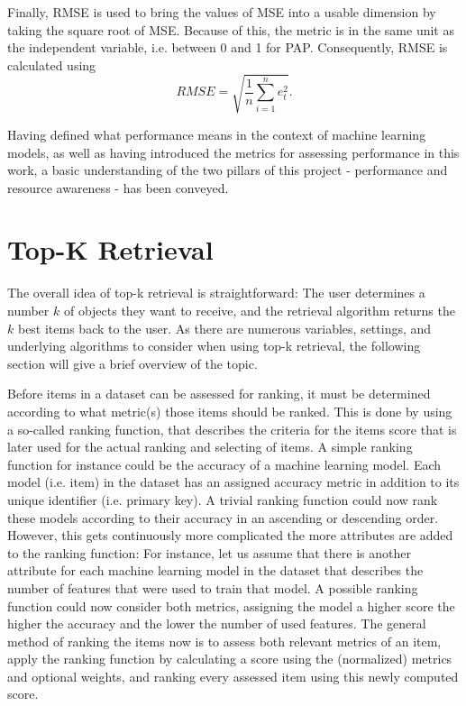 Finally, RMSE is used to bring the values of MSE into a usable dimension by taking the square root of MSE. Because of this, the metric is in the same unit as the independent variable, i.e. between 0 and 1 for PAP. Consequently, RMSE is calculated using
\begin{equation*}
RMSE = \sqrt{\frac{1}{n} \sum_{i=1}^n e_t^2 }.
\label{rmse}
\end{equation*}


Having defined what performance means in the context of machine learning models, as well as having introduced the metrics for assessing performance in this work, a basic understanding of the two pillars of this project - performance and resource awareness - has been conveyed. 



\section{Top-K Retrieval}

The overall idea of top-k retrieval is straightforward: The user determines a number $k$ of objects they want to receive, and the retrieval algorithm returns the $k$ best items back to the user. As there are numerous variables, settings, and underlying algorithms to consider when using top-k retrieval, the following section will give a brief overview of the topic. 

Before items in a dataset can be assessed for ranking, it must be determined according to what metric(s) those items should be ranked. This is done by using a so-called ranking function, that describes the criteria for the items score that is later used for the actual ranking and selecting of items. A simple ranking function for instance could be the accuracy of a machine learning model. Each model (i.e. item) in the dataset has an assigned accuracy metric in addition to its unique identifier (i.e. primary key). A trivial ranking function could now rank these models according to their accuracy in an ascending or descending order. However, this gets continuously more complicated the more attributes are added to the ranking function: For instance, let us assume that there is another attribute for each machine learning model in the dataset that describes the number of features that were used to train that model. A possible ranking function could now consider both metrics, assigning the model a higher score the higher the accuracy and the lower the number of used features. The general method of ranking the items now is to assess both relevant metrics of an item, apply the ranking function by calculating a score using the (normalized) metrics and optional weights, and ranking every assessed item using this newly computed score. 

